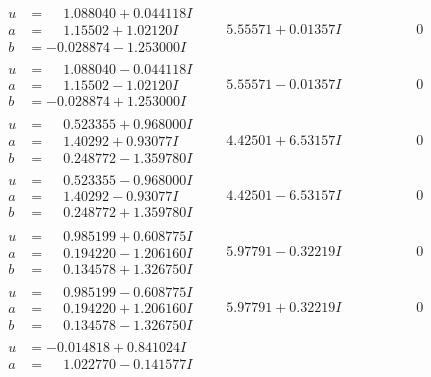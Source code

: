 \documentclass[1p]{elsarticle_modified}
\theoremstyle{definition}
\begin{document}
$$\begin{array}{c|c|c}
\begin{aligned}
u &= \phantom{-}1.088040 + 0.044118 I \\
a &= \phantom{-}1.15502 + 1.02120 I \\
b &= -0.028874 - 1.253000 I\end{aligned}
 & \phantom{-}5.55571 + 0.01357 I & \phantom{-0.000000 } 0 \\ \hline\begin{aligned}
u &= \phantom{-}1.088040 - 0.044118 I \\
a &= \phantom{-}1.15502 - 1.02120 I \\
b &= -0.028874 + 1.253000 I\end{aligned}
 & \phantom{-}5.55571 - 0.01357 I & \phantom{-0.000000 } 0 \\ \hline\begin{aligned}
u &= \phantom{-}0.523355 + 0.968000 I \\
a &= \phantom{-}1.40292 + 0.93077 I \\
b &= \phantom{-}0.248772 - 1.359780 I\end{aligned}
 & \phantom{-}4.42501 + 6.53157 I & \phantom{-0.000000 } 0 \\ \hline\begin{aligned}
u &= \phantom{-}0.523355 - 0.968000 I \\
a &= \phantom{-}1.40292 - 0.93077 I \\
b &= \phantom{-}0.248772 + 1.359780 I\end{aligned}
 & \phantom{-}4.42501 - 6.53157 I & \phantom{-0.000000 } 0 \\ \hline\begin{aligned}
u &= \phantom{-}0.985199 + 0.608775 I \\
a &= \phantom{-}0.194220 - 1.206160 I \\
b &= \phantom{-}0.134578 + 1.326750 I\end{aligned}
 & \phantom{-}5.97791 - 0.32219 I & \phantom{-0.000000 } 0 \\ \hline\begin{aligned}
u &= \phantom{-}0.985199 - 0.608775 I \\
a &= \phantom{-}0.194220 + 1.206160 I \\
b &= \phantom{-}0.134578 - 1.326750 I\end{aligned}
 & \phantom{-}5.97791 + 0.32219 I & \phantom{-0.000000 } 0 \\ \hline\begin{aligned}
u &= -0.014818 + 0.841024 I \\
a &= \phantom{-}1.022770 - 0.141577 I \\

\end{aligned}
\end{array}$$
\end{document}
